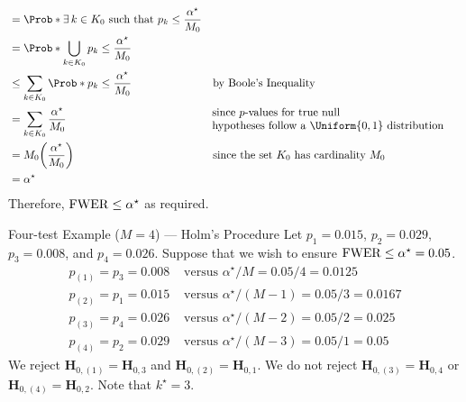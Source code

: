 \begin{Proof}{ \dagger}{}
\begin{align*}
         & =\Prob*{\exists\, k\in K_0\text{ such that }p_k\le \frac{\alpha^\star}{M_0}}                                                       \\
         & =\Prob*{\bigcup_{k\in K_0}p_k\le \frac{\alpha^\star}{M_0}}                                                                         \\
         & \le \sum_{k\in K_0}\Prob*{p_k\le \frac{\alpha^\star}{M_0}}                   &  & \text{by Boole's Inequality}                     \\
         & =\sum_{k\in K_0}\frac{\alpha^\star}{M_0}                                     &  & \!\!\!\!\begin{tabular}{l}
            \text{since $p$-values for true null} \\
            \text{hypotheses follow a $\Uniform{0,1}$ distribution}
        \end{tabular}               \\
         & =M_0\biggl(\frac{\alpha^\star}{M_0}\biggr)                                   &  & \text{since the set $K_0$ has cardinality $M_0$} \\
         & =\alpha^\star
    \end{align*}
    Therefore, $ \operatorname{FWER}\le \alpha^\star $ as required.
\end{Proof}
\begin{Example}{Four-test Example ($ M=4 $) --- Holm's Procedure}{}
    Let $ p_1=0.015 $, $ p_2=0.029 $, $ p_3=0.008 $, and $ p_4=0.026 $. Suppose that we wish to ensure
    $ \operatorname{FWER}\le \alpha^\star=0.05 $.
    \begin{align*}
        p_{(1)}=p_3=0.008 & \text{ versus } \alpha^\star/M=0.05/4=0.0125     \\
        p_{(2)}=p_1=0.015 & \text{ versus } \alpha^\star/(M-1)=0.05/3=0.0167 \\
        p_{(3)}=p_4=0.026 & \text{ versus } \alpha^\star/(M-2)=0.05/2=0.025  \\
        p_{(4)}=p_2=0.029 & \text{ versus } \alpha^\star/(M-3)=0.05/1=0.05
    \end{align*}
    We reject $ \mathbf{H}_{0,(1)}=\mathbf{H}_{0,3} $ and $ \mathbf{H}_{0,(2)}=\mathbf{H}_{0,1} $. We do not reject
    $ \mathbf{H}_{0,(3)}=\mathbf{H}_{0,4} $ or $ \mathbf{H}_{0,(4)}=\mathbf{H}_{0,2} $. Note that $ k^\star=3 $.
\end{Example}
